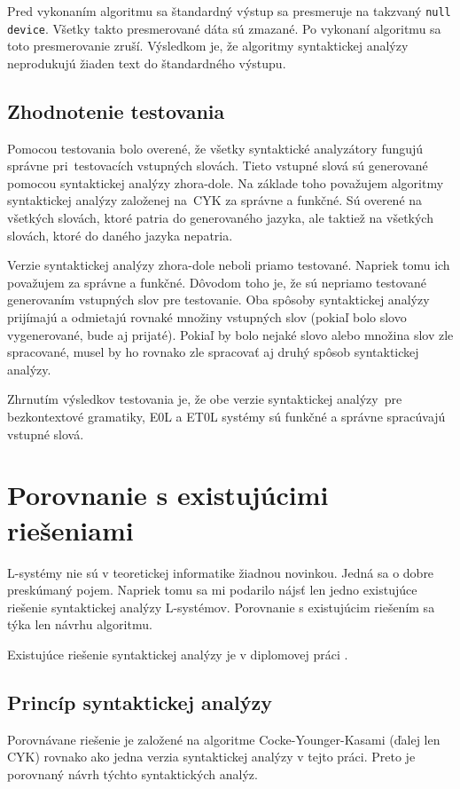 Pred vykonaním algoritmu sa štandardný výstup sa presmeruje na takzvaný \texttt{null device}. Všetky takto presmerované dáta sú zmazané. Po vykonaní algoritmu sa toto presmerovanie zruší. Výsledkom je, že algoritmy syntaktickej analýzy neprodukujú žiaden text do štandardného výstupu.

\section{Zhodnotenie testovania}
Pomocou testovania bolo overené, že všetky syntaktické analyzátory fungujú správne pri~testovacích vstupných slovách. Tieto vstupné slová sú generované pomocou syntaktickej analýzy zhora-dole. Na základe toho považujem algoritmy syntaktickej analýzy založenej na~CYK za správne a funkčné. Sú overené na všetkých slovách, ktoré patria do generovaného jazyka, ale taktiež na všetkých slovách, ktoré do daného jazyka nepatria.

Verzie syntaktickej analýzy zhora-dole neboli priamo testované. Napriek tomu ich považujem za správne a funkčné. Dôvodom toho je, že sú nepriamo testované generovaním vstupných slov pre testovanie. Oba spôsoby syntaktickej analýzy prijímajú a odmietajú rovnaké množiny vstupných slov (pokiaľ bolo slovo vygenerované, bude aj prijaté). Pokiaľ by bolo nejaké slovo alebo množina slov zle spracované, musel by ho rovnako zle spracovať aj druhý spôsob syntaktickej analýzy.

Zhrnutím výsledkov testovania je, že obe verzie syntaktickej analýzy~pre bezkontextové gramatiky, E0L a ET0L systémy sú funkčné a správne spracúvajú vstupné slová.

\chapter{Porovnanie s existujúcimi riešeniami}
\label{porovnanie}
L-systémy nie sú v teoretickej informatike žiadnou novinkou. Jedná sa o dobre preskúmaný pojem. Napriek tomu sa mi podarilo nájsť len jedno existujúce riešenie syntaktickej analýzy L-systémov. Porovnanie s existujúcim riešením sa týka len návrhu algoritmu.

Existujúce riešenie syntaktickej analýzy je v diplomovej práci \cite{FITMT21128}.

\section*{Princíp syntaktickej analýzy}
Porovnávane riešenie je založené na algoritme Cocke-Younger-Kasami (ďalej len CYK) rovnako ako jedna verzia syntaktickej analýzy v tejto práci. Preto je porovnaný návrh týchto syntaktických analýz.

